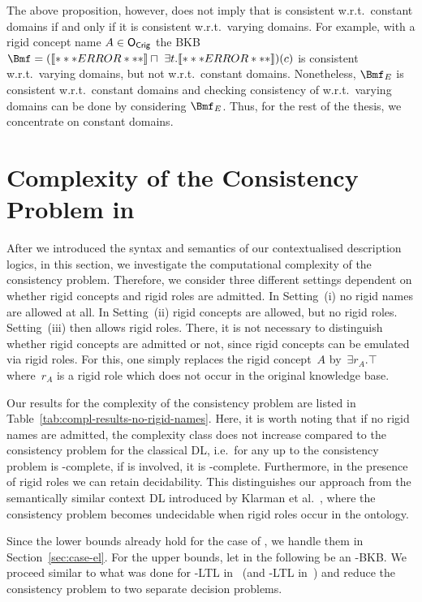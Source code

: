 \noindent
The above proposition, however, does not imply that \Bmf is consistent w.r.t.\ constant domains if
and only if it is consistent w.r.t.\ varying domains. For example, with a rigid concept name
$A\in\mathsf{O_{Crig}}$ the BKB
$\Bmf = (\oax{\top \sqsubseteq A} \sqcap\ \exists t.\oax{A \sqsubseteq \exists r.\lnot A})(c)$ is consistent w.r.t.\ varying domains, but not w.r.t.\ constant domains. Nonetheless,
$\Bmf_{E}$ is consistent w.r.t.\ constant domains and checking consistency of \Bmf w.r.t.\ varying
domains can be done by considering $\Bmf_{E}$.  Thus, for the rest of the thesis, we concentrate on
constant domains.

\section{Complexity of the Consistency Problem in \texorpdfstring{\LMLO}{LM[LO]}}
\label{sec:complexity-consis-problem}

After we introduced the syntax and semantics of our contextualised description logics, in this
section, we investigate the computational complexity of the consistency problem.  Therefore, we
consider three different settings dependent on whether rigid concepts and rigid roles are admitted.
In Setting~(i) no rigid names are allowed at all.  In Setting~(ii) rigid concepts are
allowed, but no rigid roles.  Setting~(iii) then allows rigid roles. There, it is not necessary
to distinguish whether rigid concepts are admitted or not, since rigid concepts can be emulated via
rigid roles. For this, one simply replaces the rigid concept~$A$ by~$\exists r_{A}.\top$ where~$r_{A}$ is
a rigid role which does not occur in the original knowledge base.

Our results for the complexity of the consistency problem are listed in
Table~\ref{tab:compl-results-no-rigid-names}. Here, it is worth noting that if no rigid names are
admitted, the complexity class does not increase compared to the consistency problem for the
classical DL, i.e.\ for any \LMLO up to \SHOQSHOQ the consistency problem is \ExpTime-complete, if
\SHOIQ is involved, it is \NExpTime-complete. Furthermore, in the presence of rigid roles we can
retain decidability.  This distinguishes our approach from the semantically similar context DL
introduced by Klarman et al.~\cite{KG-JELIA10,KG16}, where the consistency problem becomes
undecidable when rigid roles occur in the ontology.

Since the lower bounds already hold for the case of \EL, we handle them in Section~\ref{sec:case-el}.
%
For the upper bounds, let in the following \BB be an \LMLO-BKB.  We proceed
similar to what was done for \ALC-LTL in~\cite{BaGL-KR08,BaGL-ToCL12} (and
\SHOQ-LTL in~\cite{Lip-PhD14}) and reduce the consistency problem to two separate
decision problems.

